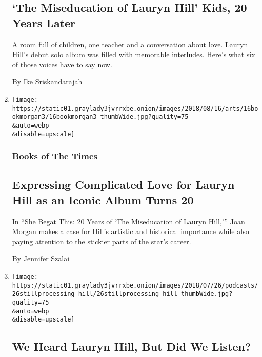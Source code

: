 \begin{enumerate}
  \hypertarget{the-miseducation-of-lauryn-hill-kids-20-years-later}{%
  \subsection{`The Miseducation of Lauryn Hill' Kids, 20 Years
  Later}\label{the-miseducation-of-lauryn-hill-kids-20-years-later}}

  A room full of children, one teacher and a conversation about love.
  Lauryn Hill's debut solo album was filled with memorable interludes.
  Here's what six of those voices have to say now.

  By Ike Sriskandarajah
\item
  \href{/2018/08/15/books/review-she-begat-this-lauryn-hill-joan-morgan.html}{}

  \texttt{[image: https://static01.graylady3jvrrxbe.onion/images/2018/08/16/arts/16bookmorgan3/16bookmorgan3-thumbWide.jpg?quality=75\\\&auto=webp\\\&disable=upscale]}

  \hypertarget{books-of-the-times}{%
  \subsubsection{Books of The Times}\label{books-of-the-times}}

  \hypertarget{expressing-complicated-love-for-lauryn-hill-as-an-iconic-album-turns-20}{%
  \subsection{Expressing Complicated Love for Lauryn Hill as an Iconic
  Album Turns
  20}\label{expressing-complicated-love-for-lauryn-hill-as-an-iconic-album-turns-20}}

  In ``She Begat This: 20 Years of `The Miseducation of Lauryn Hill,'''
  Joan Morgan makes a case for Hill's artistic and historical importance
  while also paying attention to the stickier parts of the star's
  career.

  By Jennifer Szalai
\item
  \href{/2018/07/26/podcasts/still-processing-lauryn-hill-miseducation.html}{}

  \texttt{[image: https://static01.graylady3jvrrxbe.onion/images/2018/07/26/podcasts/26stillprocessing-hill/26stillprocessing-hill-thumbWide.jpg?quality=75\\\&auto=webp\\\&disable=upscale]}

  \hypertarget{we-heard-lauryn-hill-but-did-we-listen}{%
  \subsection{We Heard Lauryn Hill, But Did We
  Listen?}\label{we-heard-lauryn-hill-but-did-we-listen}}


\end{enumerate}
